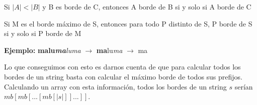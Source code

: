 \begin{corolario}
    Si $|A| < |B|$ y B es borde de C, entonces A borde de B si y solo si A borde de C
\end{corolario}

\begin{corolario}
    Si M es el borde máximo de S, entonces para todo P distinto de S, P borde de S si y solo si P borde de M
\end{corolario}

\textbf{Ejemplo:} \textbf{malu\textit{ma}}\textit{luma} $\to$ \textbf{ma}lu\textit{ma} $\to$ ma

Lo que conseguimos con esto es darnos cuenta de que para calcular todos los bordes de un string basta con calcular el máximo borde de todos sus prefijos. Calculando un array con esta información, todos los bordes de un string $s$ serían $mb[mb[...[mb[|s|]]...]]$.

